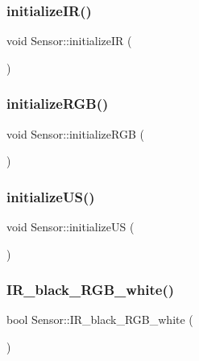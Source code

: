 \subsubsection{\texorpdfstring{initialize\+I\+R()}{initializeIR()}}
{\footnotesize\ttfamily void Sensor\+::initialize\+IR (\begin{DoxyParamCaption}{ }\end{DoxyParamCaption})}

\mbox{\label{class_sensor_a1684cc490c5dd360890d2c0cdfd23fd3}} 
\subsubsection{\texorpdfstring{initialize\+R\+G\+B()}{initializeRGB()}}
{\footnotesize\ttfamily void Sensor\+::initialize\+R\+GB (\begin{DoxyParamCaption}{ }\end{DoxyParamCaption})}

\mbox{\label{class_sensor_a77a538443f5e024bbd144cc56eed3319}} 
\subsubsection{\texorpdfstring{initialize\+U\+S()}{initializeUS()}}
{\footnotesize\ttfamily void Sensor\+::initialize\+US (\begin{DoxyParamCaption}{ }\end{DoxyParamCaption})}

\mbox{\label{class_sensor_a03b8f6886c672badadfeef89d069e1ea}} 
\subsubsection{\texorpdfstring{I\+R\+\_\+black\+\_\+\+R\+G\+B\+\_\+white()}{IR\_black\_RGB\_white()}}
{\footnotesize\ttfamily bool Sensor\+::\+I\+R\+\_\+black\+\_\+\+R\+G\+B\+\_\+white (\begin{DoxyParamCaption}{ }\end{DoxyParamCaption})}

